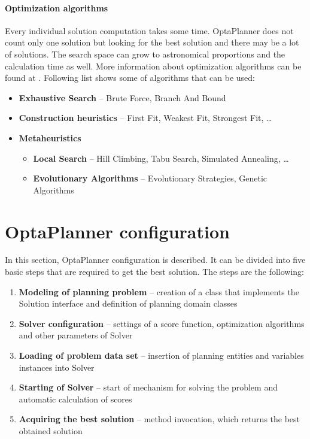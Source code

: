 \paragraph{Optimization algorithms}\label{optimalAlg}
Every individual solution computation takes some time. OptaPlanner does not count only one solution but looking for the best solution and there may be a lot of solutions. The search space can grow to astronomical proportions and the calculation time as well. More information about optimization algorithms can be found at \cite{OptaPlannerDoc}. Following list shows some of algorithms that can be used:
\begin{itemize}
\item \textbf{Exhaustive Search} -- Brute Force,  Branch And Bound
\item \textbf{Construction heuristics} --  First Fit, Weakest Fit,  Strongest Fit, \dots
\item \textbf{Metaheuristics}
\begin{itemize}
\item \textbf{Local Search} --  Hill Climbing, Tabu Search, Simulated Annealing, \dots
\item \textbf{Evolutionary Algorithms} -- Evolutionary Strategies, Genetic Algorithms
\end{itemize}
\end{itemize}

\section{OptaPlanner configuration}\label{plannerConf}
In this section, OptaPlanner configuration is described. It can be divided into five basic steps that are required to get the best solution. The steps are the following:

\begin{enumerate}
\item \textbf{Modeling of planning problem} -- creation of a class that implements the Solution interface and definition of planning domain classes
\item \textbf{Solver configuration} -- settings of a score function, optimization algorithms and other parameters of Solver
\item \textbf{Loading of problem data set} -- insertion of planning entities and variables instances into Solver
\item \textbf{Starting of Solver} -- start of mechanism for solving the problem and automatic calculation of scores
\item \textbf{Acquiring the best solution} -- method invocation, which returns the best obtained solution
\end{enumerate}

